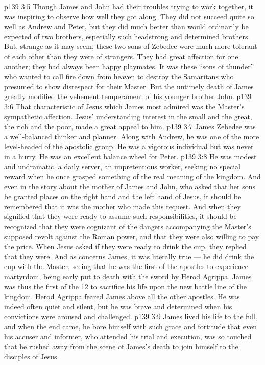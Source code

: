 \vs p139 3:5 Though James and John had their troubles trying to work together, it was inspiring to observe how well they got along. They did not succeed quite so well as Andrew and Peter, but they did much better than would ordinarily be expected of two brothers, especially such headstrong and determined brothers. But, strange as it may seem, these two sons of Zebedee were much more tolerant of each other than they were of strangers. They had great affection for one another; they had always been happy playmates. It was these “sons of thunder” who wanted to call fire down from heaven to destroy the Samaritans who presumed to show disrespect for their Master. But the untimely death of James greatly modified the vehement temperament of his younger brother John.
\vs p139 3:6 \pc That characteristic of Jesus which James most admired was the Master’s sympathetic affection. Jesus’ understanding interest in the small and the great, the rich and the poor, made a great appeal to him.
\vs p139 3:7 \pc James Zebedee was a well\hyp{}balanced thinker and planner. Along with Andrew, he was one of the more level\hyp{}headed of the apostolic group. He was a vigorous individual but was never in a hurry. He was an excellent balance wheel for Peter.
\vs p139 3:8 He was modest and undramatic, a daily server, an unpretentious worker, seeking no special reward when he once grasped something of the real meaning of the kingdom. And even in the story about the mother of James and John, who asked that her sons be granted places on the right hand and the left hand of Jesus, it should be remembered that it was the mother who made this request. And when they signified that they were ready to assume such responsibilities, it should be recognized that they were cognizant of the dangers accompanying the Master’s supposed revolt against the Roman power, and that they were also willing to pay the price. When Jesus asked if they were ready to drink the cup, they replied that they were. And as concerns James, it was literally true --- he did drink the cup with the Master, seeing that he was the first of the apostles to experience martyrdom, being early put to death with the sword by Herod Agrippa. James was thus the first of the 12 to sacrifice his life upon the new battle line of the kingdom. Herod Agrippa feared James above all the other apostles. He was indeed often quiet and silent, but he was brave and determined when his convictions were aroused and challenged.
\vs p139 3:9 \pc James lived his life to the full, and when the end came, he bore himself with such grace and fortitude that even his accuser and informer, who attended his trial and execution, was so touched that he rushed away from the scene of James’s death to join himself to the disciples of Jesus.
